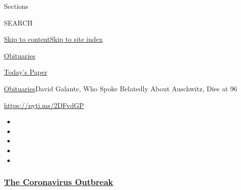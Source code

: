 Sections

SEARCH

\protect\hyperlink{site-content}{Skip to
content}\protect\hyperlink{site-index}{Skip to site index}

\href{https://www.nytimes3xbfgragh.onion/section/obituaries}{Obituaries}

\href{https://myaccount.nytimes3xbfgragh.onion/auth/login?response_type=cookie\&client_id=vi}{}

\href{https://www.nytimes3xbfgragh.onion/section/todayspaper}{Today's
Paper}

\href{/section/obituaries}{Obituaries}\textbar{}David Galante, Who Spoke
Belatedly About Auschwitz, Dies at 96

\url{https://nyti.ms/2DFvdGP}

\begin{itemize}
\item
\item
\item
\item
\item
\end{itemize}

\hypertarget{the-coronavirus-outbreak}{%
\subsubsection{\texorpdfstring{\href{https://www.nytimes3xbfgragh.onion/news-event/coronavirus?name=promo-coronavirus-obits\&region=TOP_BANNER\&variant=undefined\&block=storyline_menu_recirc\&action=click\&pgtype=Article\&impression_id=fdb215b0-e3af-11ea-b09c-a17bea779444}{The
Coronavirus
Outbreak}}{The Coronavirus Outbreak}}\label{the-coronavirus-outbreak}}

